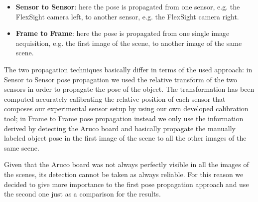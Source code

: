 \begin{itemize}
	\item \textbf{Sensor to Sensor}: here the pose is propagated from one sensor, e.g. the FlexSight camera left, to another sensor, e.g. the FlexSight camera right.
	\item \textbf{Frame to Frame}: here the pose is propagated from one single image acquisition, e.g. the first image of the scene, to another image of the same scene.
\end{itemize}

The two propagation techniques basically differ in terms of the used approach: in Sensor to Sensor pose propagation we used the relative transform of the two sensors in order to propagate the pose of the object. The transformation has been computed accurately calibrating the relative position of each sensor that composes our experimental sensor setup by using our own developed calibration tool; in Frame to Frame pose propagation instead we only use the information derived by detecting the Aruco board and basically propagate the manually labeled object pose in the first image of the scene to all the other images of the same scene.

Given that the Aruco board was not always perfectly visible in all the images of the scenes, its detection cannot be taken as always reliable. For this reason we decided to give more importance to the first pose propagation approach and use the second one just as a comparison for the results.